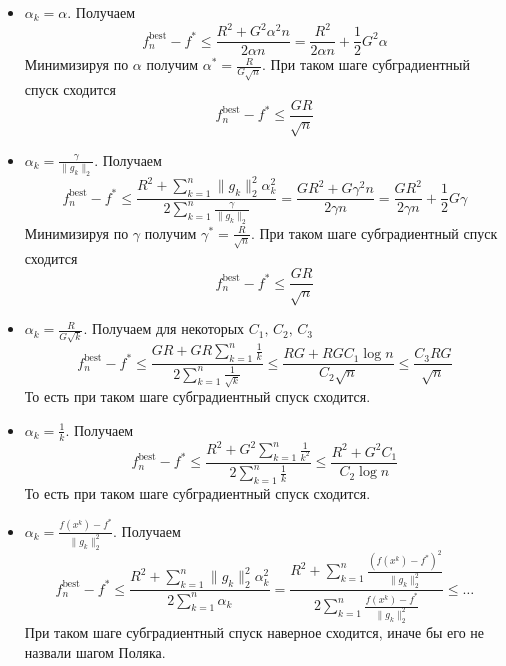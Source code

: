 \documentclass{article}
\begin{document}
\begin{itemize}
    \item $\alpha_k = \alpha$. Получаем
        \[ f_n^\text{best} - f^\ast \leqslant \frac{R^2 + G^2 \alpha^2 n}{ 2 \alpha n } = \frac{R^2}{2 \alpha n} + \frac12 G^2 \alpha \]
        Минимизируя по $\alpha$ получим $\alpha^\ast = \frac{R}{G \sqrt{n}}$. При таком шаге субградиентный спуск сходится
        \[ f_n^\text{best} - f^\ast \leqslant \frac{GR}{\sqrt{n}} \]
    \item $\alpha_k = \frac{\gamma}{\| g_k \|_2}$. Получаем
        \[ f_n^\text{best} - f^\ast \leqslant \frac{R^2 + \sum\limits_{k = 1}^n \| g_k \|_2^2 \alpha_k^2}{ 2 \sum\limits_{k = 1}^n \frac{\gamma}{\|g_k\|_2} } = \frac{GR^2 + G\gamma^2 n}{2 \gamma n } = \frac{GR^2}{2 \gamma n} + \frac12 G \gamma \]
        Минимизируя по $\gamma$ получим $\gamma^\ast = \frac{R}{\sqrt{n}}$. При таком шаге субградиентный спуск сходится
        \[ f_n^\text{best} - f^\ast \leqslant \frac{GR}{\sqrt{n}} \]
    \item $\alpha_k = \frac{R}{G\sqrt{k}}$. Получаем для некоторых $C_1,\, C_2,\, C_3$
        \[ f_n^\text{best} - f^\ast \leqslant \frac{GR + GR \sum\limits_{k = 1}^n \frac{1}{k}}{ 2 \sum\limits_{k = 1}^n \frac{1}{\sqrt{k}} } \leqslant \frac{RG + RGC_1 \log n}{C_2 \sqrt{n}} \leqslant \frac{C_3 RG}{\sqrt{n}} \]
        То есть при таком шаге субградиентный спуск сходится.
    \item $\alpha_k = \frac{1}{k}$. Получаем
        \[ f_n^\text{best} - f^\ast \leqslant \frac{R^2 + G^2 \sum\limits_{k = 1}^n \frac{1}{k^2}}{ 2 \sum\limits_{k = 1}^n \frac{1}{k} } \leqslant \frac{R^2 + G^2 C_1}{C_2 \log n} \]
        То есть при таком шаге субградиентный спуск сходится.
    \item $\alpha_k = \frac{f(x^k) - f^\ast}{\| g_k \|_2^2}$. Получаем
        \[ f_n^\text{best} - f^\ast \leqslant \frac{R^2 + \sum\limits_{k = 1}^n \| g_k \|_2^2 \alpha_k^2}{ 2 \sum\limits_{k = 1}^n \alpha_k } = \frac{R^2 + \sum\limits_{k = 1}^n \frac{\left( f(x^k) - f^\ast \right)^2}{\|g_k\|_2^2}}{2 \sum\limits_{k = 1}^n \frac{f(x^k) - f^\ast}{\|g_k\|_2^2}} \leqslant \dotsc \]
        При таком шаге субградиентный спуск наверное сходится, иначе бы его не назвали шагом Поляка.
\end{itemize}
\end{document}
